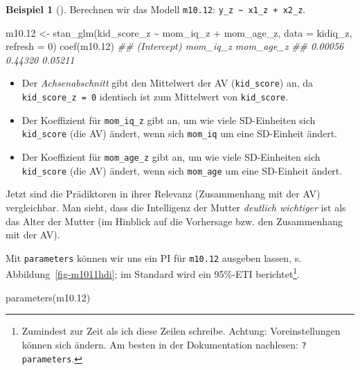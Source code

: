 \documentclass[
  ngerman,
  letterpaper,
  twoside,
  open=any]{scrbook}
\newenvironment{Shaded}{\begin{snugshade}}{\end{snugshade}}
\newcommand{\AttributeTok}[1]{\textcolor[rgb]{0.40,0.45,0.13}{#1}}
\newcommand{\DecValTok}[1]{\textcolor[rgb]{0.68,0.00,0.00}{#1}}
\newcommand{\DocumentationTok}[1]{\textcolor[rgb]{0.37,0.37,0.37}{\textit{#1}}}
\newcommand{\FloatTok}[1]{\textcolor[rgb]{0.68,0.00,0.00}{#1}}
\newcommand{\FunctionTok}[1]{\textcolor[rgb]{0.28,0.35,0.67}{#1}}
\newcommand{\NormalTok}[1]{\textcolor[rgb]{0.00,0.23,0.31}{#1}}
\newcommand{\OtherTok}[1]{\textcolor[rgb]{0.00,0.23,0.31}{#1}}
\newcommand{\SpecialCharTok}[1]{\textcolor[rgb]{0.37,0.37,0.37}{#1}}
\providecommand{\tightlist}{%
  \setlength{\itemsep}{0pt}\setlength{\parskip}{0pt}}\usepackage{longtable,booktabs,array}
\theoremstyle{definition}
\newtheorem{example}{Beispiel}[chapter]
\theoremstyle{plain}
\theoremstyle{definition}
\theoremstyle{definition}
\theoremstyle{remark}
\begin{document}
\begin{example}[]
Berechnen wir das Modell \texttt{m10.12}:
\texttt{y\_z\ \textasciitilde{}\ x1\_z\ +\ x2\_z}.

\begin{Shaded}
\begin{Highlighting}[]
\NormalTok{m10}\FloatTok{.12} \OtherTok{\textless{}{-}} \FunctionTok{stan\_glm}\NormalTok{(kid\_score\_z }\SpecialCharTok{\textasciitilde{}}\NormalTok{ mom\_iq\_z }\SpecialCharTok{+}\NormalTok{ mom\_age\_z, }
                   \AttributeTok{data =}\NormalTok{ kidiq\_z, }
                   \AttributeTok{refresh =} \DecValTok{0}\NormalTok{)}
\FunctionTok{coef}\NormalTok{(m10}\FloatTok{.12}\NormalTok{)}
\DocumentationTok{\#\# (Intercept)    mom\_iq\_z   mom\_age\_z }
\DocumentationTok{\#\#     0.00056     0.44320     0.05211}
\end{Highlighting}
\end{Shaded}

\begin{itemize}
\tightlist
\item
  Der \emph{Achsenabschnitt} gibt den Mittelwert der AV
  (\texttt{kid\_score}) an, da \texttt{kid\_score\_z\ =\ 0} identisch
  ist zum Mittelwert von \texttt{kid\_score}.
\item
  Der Koeffizient für \texttt{mom\_iq\_z} gibt an, um wie viele
  SD-Einheiten sich \texttt{kid\_score} (die AV) ändert, wenn sich
  \texttt{mom\_iq} um eine SD-Einheit ändert.
\item
  Der Koeffizient für \texttt{mom\_age\_z} gibt an, um wie viele
  SD-Einheiten sich \texttt{kid\_score} (die AV) ändert, wenn sich
  \texttt{mom\_age} um eine SD-Einheit ändert.
\end{itemize}

Jetzt sind die Prädiktoren in ihrer Relevanz (Zusammenhang mit der AV)
vergleichbar. Man sieht, dass die Intelligenz der Mutter \emph{deutlich
wichtiger} ist als das Alter der Mutter (im Hinblick auf die Vorhersage
bzw. den Zusammenhang mit der AV).

Mit \texttt{parameters} können wir uns ein PI für \texttt{m10.12}
ausgeben lassen, s. Abbildung~\ref{fig-m1011hdi}; im Standard wird ein
95\%-ETI berichtet\footnote{Zumindest zur Zeit als ich diese Zeilen
  schreibe. Achtung: Voreinstellungen können sich ändern. Am besten in
  der Dokumentation nachlesen: \texttt{?parameters}.}.

\begin{Shaded}
\begin{Highlighting}[]
\FunctionTok{parameters}\NormalTok{(m10}\FloatTok{.12}\NormalTok{) }
\end{Highlighting}
\end{Shaded}


\end{example}
\end{document}
